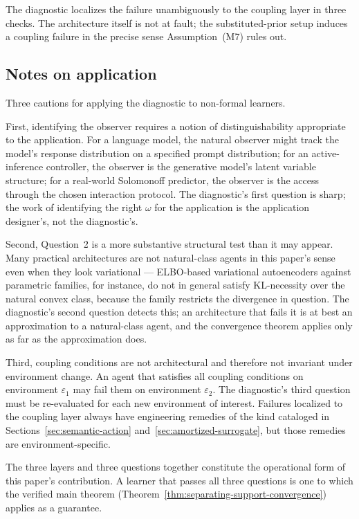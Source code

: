 \documentclass[11pt]{article}
\theoremstyle{definition}
\theoremstyle{remark}
\begin{document}
The diagnostic localizes the failure unambiguously to the coupling layer in three checks. The architecture itself is not at fault; the substituted-prior setup induces a coupling failure in the precise sense Assumption~\textup{(M7)} rules out.

\subsection{Notes on application}
\label{app:diagnostic-notes}

Three cautions for applying the diagnostic to non-formal learners.

First, identifying the observer requires a notion of distinguishability appropriate to the application. For a language model, the natural observer might track the model's response distribution on a specified prompt distribution; for an active-inference controller, the observer is the generative model's latent variable structure; for a real-world Solomonoff predictor, the observer is the access through the chosen interaction protocol. The diagnostic's first question is sharp; the work of identifying the right $\omega$ for the application is the application designer's, not the diagnostic's.

Second, Question~2 is a more substantive structural test than it may appear. Many practical architectures are not natural-class agents in this paper's sense even when they look variational --- ELBO-based variational autoencoders against parametric families, for instance, do not in general satisfy KL-necessity over the natural convex class, because the family restricts the divergence in question. The diagnostic's second question detects this; an architecture that fails it is at best an approximation to a natural-class agent, and the convergence theorem applies only as far as the approximation does.

Third, coupling conditions are not architectural and therefore not invariant under environment change. An agent that satisfies all coupling conditions on environment $\varepsilon_1$ may fail them on environment $\varepsilon_2$. The diagnostic's third question must be re-evaluated for each new environment of interest. Failures localized to the coupling layer always have engineering remedies of the kind cataloged in Sections~\ref{sec:semantic-action} and~\ref{sec:amortized-surrogate}, but those remedies are environment-specific.

The three layers and three questions together constitute the operational form of this paper's contribution. A learner that passes all three questions is one to which the verified main theorem (Theorem~\ref{thm:separating-support-convergence}) applies as a guarantee.




\end{document}

